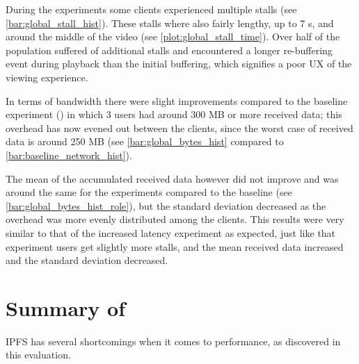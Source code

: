 During the experiments some clients experienced multiple stalls (see \autoref{bar:global_stall_hist}). These stalls where also fairly lengthy, up to 7 \ac{s}, and around the middle of the video (see \autoref{plot:global_stall_time}). Over half of the population suffered of additional stalls and encountered a longer re-buffering event during playback than the initial buffering, which signifies a poor \ac{UX} of the viewing experience.






In terms of bandwidth there were slight improvements compared to the baseline experiment () in which 3 users had around 300 \ac{MB} or more received data; this overhead has now evened out between the clients, since the worst case of received data is around 250 \ac{MB} (see \autoref{bar:global_bytes_hist} compared to \autoref{bar:baseline_network_hist}).

The mean of the accumulated received data however did not improve and was around the same for the experiments compared to the baseline (see \autoref{bar:global_bytes_hist_role}), but the standard deviation decreased as the overhead was more evenly distributed among the clients.
This results were very similar to that of the increased latency experiment as expected, just like that experiment users get slightly more stalls, and the mean received data increased and the standard deviation decreased.






\FloatBarrier \section{Summary of }

\ac{IPFS} has several shortcomings when it comes to performance, as discovered in this evaluation.

